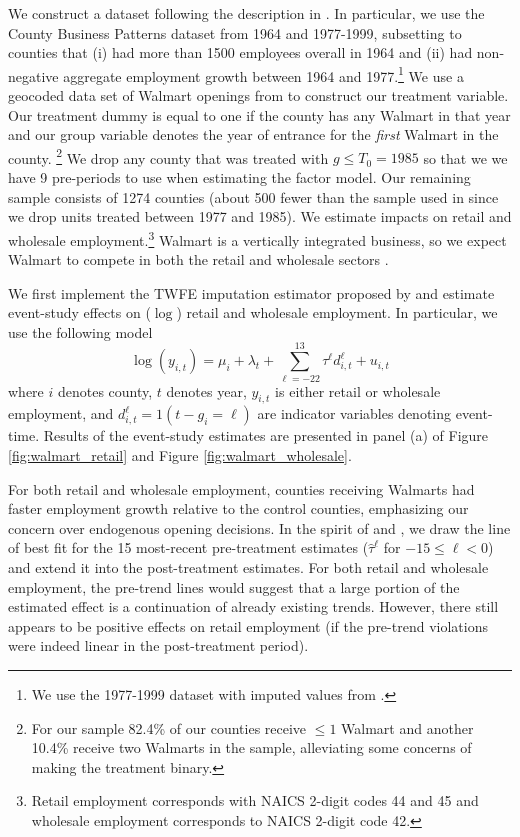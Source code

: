 \documentclass[12pt]{article}
\begin{document}
We construct a dataset following the description in \citet{basker2005job}. In particular, we use the County Business Patterns dataset from 1964 and 1977-1999, subsetting to counties that (i) had more than 1500 employees overall in 1964 and (ii) had non-negative aggregate employment growth between 1964 and 1977.\footnote{We use the 1977-1999 dataset with imputed values from \citet{eckert2021imputing}.} We use a geocoded data set of Walmart openings from \citet{arcidiacono2020competitive} to construct our treatment variable. Our treatment dummy is equal to one if the county has any Walmart in that year and our group variable denotes the year of entrance for the \emph{first} Walmart in the county. \footnote{For our sample 82.4\% of our counties receive $\leq 1$ Walmart and another 10.4\% receive two Walmarts in the sample, alleviating some concerns of making the treatment binary.} We drop any county that was treated with $g \leq T_0 = 1985$ so that we we have 9 pre-periods to use when estimating the factor model. Our remaining sample consists of 1274 counties (about 500 fewer than the sample used in \citet{basker2005job} since we drop units treated between 1977 and 1985). We estimate impacts on retail and wholesale employment.\footnote{Retail employment corresponds with NAICS 2-digit codes 44 and 45 and wholesale employment corresponds to NAICS 2-digit code 42.} Walmart is a vertically integrated business, so we expect Walmart to compete in both the retail and wholesale sectors \citep{basker2005job}.

We first implement the TWFE imputation estimator proposed by \citet{Borusyak_Jaravel_Spiess_2021} and estimate event-study effects on ($\log$) retail and wholesale employment. In particular, we use the following model
\begin{equation}\label{eq:Walmart_twfe}
  \log(y_{i,t}) = \mu_i + \lambda_t + \sum_{\ell=-22}^{13} \tau^\ell d_{i,t}^\ell + u_{i,t}
\end{equation}
where $i$ denotes county, $t$ denotes year, $y_{i,t}$ is either retail or wholesale employment, and $d_{i,t}^\ell = 1(t - g_i = \ell)$ are indicator variables denoting event-time. Results of the event-study estimates are presented in panel (a) of Figure \ref{fig:walmart_retail} and Figure \ref{fig:walmart_wholesale}.

For both retail and wholesale employment, counties receiving Walmarts had faster employment growth relative to the control counties, emphasizing our concern over endogenous opening decisions. In the spirit of \citet{Freyaldenhoven_Hansen_Perez_Shapiro_2022} and \citet{rambachan2023more}, we draw the line of best fit for the 15 most-recent pre-treatment estimates ($\hat{\tau}^\ell$ for $-15 \leq \ell < 0$) and extend it into the post-treatment estimates. For both retail and wholesale employment, the pre-trend lines would suggest that a large portion of the estimated effect is a continuation of already existing trends. However, there still appears to be positive effects on retail employment (if the pre-trend violations were indeed linear in the post-treatment period). 
\end{document}
